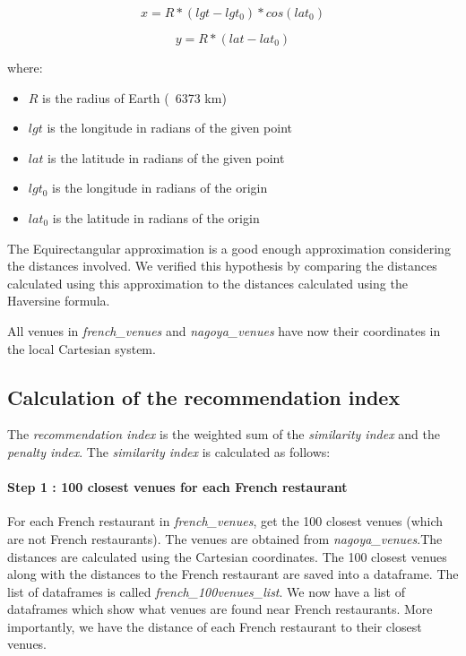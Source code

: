 \documentclass[12pt,a4paper]{article}
\begin{document}
\begin{equation}
	x = R * (lgt - lgt_0) * cos (lat_0)	
\end{equation}

\begin{equation}
	y = R * (lat - lat_0)
\end{equation}

where:

\begin{itemize}
  \item $R$ is the radius of Earth (~6373 km)
  \item $lgt$ is the longitude in radians of the given point
  \item $lat$ is the latitude in radians of the given point
  \item $lgt_0$ is the longitude in radians of the origin
  \item $lat_0$ is the latitude in radians of the origin
\end{itemize}
 
The Equirectangular approximation is a good enough approximation considering the distances involved. We verified this hypothesis by comparing the distances calculated using this approximation to the distances calculated using the Haversine formula.

\medskip

All venues in \textit{french\_venues} and \textit{nagoya\_venues} have now their coordinates in the local Cartesian system.
 
\subsection{Calculation of the recommendation index}

\medskip

The \textit{recommendation index} is the weighted sum of the \textit{similarity index} and the  \textit{penalty index}. 
The \textit{similarity index} is calculated as follows: 

\paragraph{Step 1 : 100 closest venues for each French restaurant}
For each French restaurant in \textit{french\_venues}, get the 100 closest venues (which are not French restaurants). The venues are obtained from \textit{nagoya\_venues}.The distances are calculated using the Cartesian coordinates. The 100 closest venues along with the distances to the French restaurant are saved into a dataframe. The list of dataframes is called \textit{french\_100venues\_list}. We now have a list of dataframes which show what venues are found near French restaurants. More importantly, we have the distance of each French restaurant to their closest venues.
\end{document}

